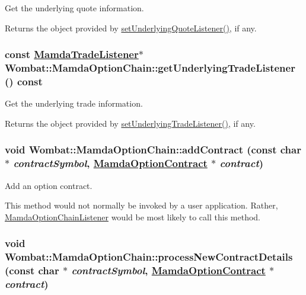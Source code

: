 Get the underlying quote information. 

Returns the object provided by \hyperlink{classWombat_1_1MamdaOptionChain_5a4d5775be29a6f0e63d40723c9f2a0e}{set\-Underlying\-Quote\-Listener()}, if any. \hypertarget{classWombat_1_1MamdaOptionChain_0063439822d2ce9579359a364c4a08c7}{
\subsubsection[getUnderlyingTradeListener]{\setlength{\rightskip}{0pt plus 5cm}const \hyperlink{classWombat_1_1MamdaTradeListener}{Mamda\-Trade\-Listener}$\ast$ Wombat::Mamda\-Option\-Chain::get\-Underlying\-Trade\-Listener () const}}
\label{classWombat_1_1MamdaOptionChain_0063439822d2ce9579359a364c4a08c7}


Get the underlying trade information. 

Returns the object provided by \hyperlink{classWombat_1_1MamdaOptionChain_5402589f97170ab7b23cdc6d6444043b}{set\-Underlying\-Trade\-Listener()}, if any. \hypertarget{classWombat_1_1MamdaOptionChain_bf155ef60b006915b493d70243e06640}{
\subsubsection[addContract]{\setlength{\rightskip}{0pt plus 5cm}void Wombat::Mamda\-Option\-Chain::add\-Contract (const char $\ast$ {\em contract\-Symbol}, \hyperlink{classWombat_1_1MamdaOptionContract}{Mamda\-Option\-Contract} $\ast$ {\em contract})}}
\label{classWombat_1_1MamdaOptionChain_bf155ef60b006915b493d70243e06640}


Add an option contract. 

This method would not normally be invoked by a user application. Rather, \hyperlink{classWombat_1_1MamdaOptionChainListener}{Mamda\-Option\-Chain\-Listener} would be most likely to call this method. \hypertarget{classWombat_1_1MamdaOptionChain_5beee45c6d8385a030c99f114259657f}{
\subsubsection[processNewContractDetails]{\setlength{\rightskip}{0pt plus 5cm}void Wombat::Mamda\-Option\-Chain::process\-New\-Contract\-Details (const char $\ast$ {\em contract\-Symbol}, \hyperlink{classWombat_1_1MamdaOptionContract}{Mamda\-Option\-Contract} $\ast$ {\em contract})}}
\label{classWombat_1_1MamdaOptionChain_5beee45c6d8385a030c99f114259657f}


